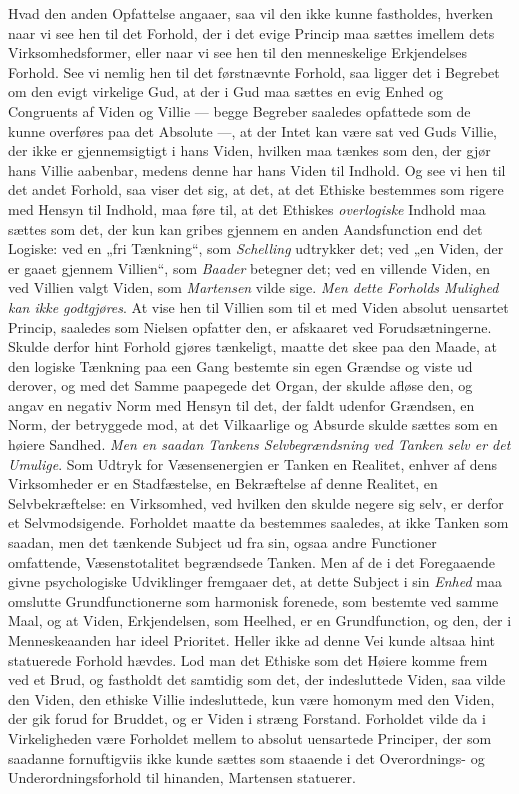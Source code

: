 \documentclass[12pt,a4paper]{book}
\newcommand{\opage}[1]{\marginnote{\footnotesize\textit{[#1]}}}
\begin{document}
Hvad den anden Opfattelse angaaer, saa vil den ikke kunne fastholdes, hverken naar
vi see hen til det Forhold, der i det evige Princip maa sættes imellem dets
Virksomhedsformer, eller naar vi see hen til den menneskelige Erkjendelses Forhold.
See vi nemlig hen til det førstnævnte Forhold, saa ligger det i Begrebet om den
evigt virkelige Gud, at der i Gud maa sættes en evig Enhed og Congruents af Viden
og Villie --- begge Begreber saaledes opfattede som de kunne overføres paa det
Absolute ---, at der Intet kan være sat ved Guds Villie, der ikke er gjennemsigtigt
i hans Viden, hvilken maa tænkes som den, der gjør hans Villie aabenbar, medens
denne har hans Viden til Indhold. Og see vi hen til det andet Forhold, saa viser
det sig, at det, at det Ethiske bestemmes som rigere med Hensyn til Indhold, maa
føre til, at det Ethiskes \emph{overlogiske} Indhold maa sættes som det, der kun kan
gribes gjennem en anden Aandsfunction end det Logiske: ved en „fri Tænkning“, som \emph{Schelling} udtrykker det; ved „en Viden, der er gaaet gjennem Villien“, som \emph{Baader}
betegner \opage{60}det; ved en villende Viden, en ved Villien valgt Viden, som \emph{Martensen} vilde sige. \emph{Men dette Forholds Mulighed kan ikke godtgjøres}. At vise hen til
Villien som til et med Viden absolut uensartet Princip, saaledes som Nielsen
opfatter den, er afskaaret ved Forudsætningerne. Skulde derfor hint Forhold gjøres
tænkeligt, maatte det skee paa den Maade, at den logiske Tænkning paa een Gang
bestemte sin egen Grændse og viste ud derover, og med det Samme paapegede det
Organ, der skulde afløse den, og angav en negativ Norm med Hensyn til det, der
faldt udenfor Grændsen, en Norm, der betryggede mod, at det Vilkaarlige og Absurde
skulde sættes som en høiere Sandhed. \emph{Men en saadan Tankens Selvbegrændsning ved Tanken selv er det Umulige}. Som Udtryk for Væsensenergien er Tanken en Realitet,
enhver af dens Virksomheder er en Stadfæstelse, en Bekræftelse af denne Realitet,
en Selvbekræftelse: en Virksomhed, ved hvilken den skulde negere sig selv, er
derfor et Selvmodsigende. Forholdet maatte da bestemmes saaledes, at ikke Tanken
som saadan, men det tænkende Subject ud fra sin, ogsaa andre Functioner omfattende,
Væsenstotalitet begrændsede Tanken. Men af de i det Foregaaende givne psychologiske
Udviklinger fremgaaer det, at dette Subject i sin \emph{Enhed} maa omslutte
Grundfunctionerne som harmonisk forenede, som bestemte ved samme Maal, og at Viden,
Erkjendelsen, som Heelhed, er en Grundfunction, og den, der i Menneskeaanden har
ideel Prioritet. Heller ikke ad denne Vei kunde altsaa hint statuerede Forhold
hævdes. Lod man det Ethiske som det Høiere komme frem ved et Brud, og fastholdt det
samtidig som det, der indesluttede Viden, saa vilde den Viden, den ethiske Villie
indesluttede, kun være homonym med den Viden, der gik forud for Bruddet, og er
Viden i stræng Forstand. Forholdet vilde da i Virkeligheden være Forholdet mellem
to absolut uensartede Principer, der som saadanne fornuftigviis ikke kunde sættes
som staaende i det Overordnings- og Underordningsforhold til hinanden, Martensen
statuerer.
\end{document}
